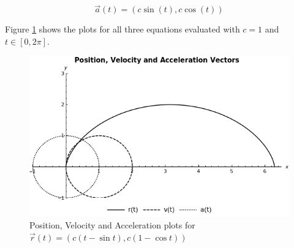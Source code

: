 \documentclass[letterpaper,12pt]{article}
\begin{document}
 \begin{equation*}
  \vec{a}(t) = (c \sin (t), c \cos (t))
 \end{equation*}
 
 Figure \ref{fig: vector 4} shows the plots for all three equations evaluated 
with $c = 1$ and $t \in 
\left [ 0, 2 \pi \right ] $.
 
 \begin{figure}[h]
 \centering

\includegraphics[scale=0.4,keepaspectratio=true]{./img/graph04.png}
 \caption{Position, Velocity and Acceleration plots for 
$\vec{r}(t) = ( c (t - \sin t), c (1 - \cos t))$
}
 \label{fig: vector 4}
\end{figure}
 
\end{document}
